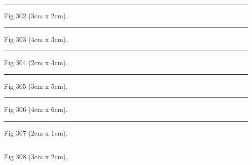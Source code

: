 \documentclass[a4paper,11pt]{article}
\begin{document}
\begin{swarmwrap}%
  \begin{minipage}[t]{3cm}
    \centering
    \rule{\linewidth}{2cm}
    {\footnotesize Fig 302 (3cm x 2cm).}
  \end{minipage}%
\end{swarmwrap}%
\swarmwrapnext
\lipsum[2]%

\begin{swarmwrap}%
  \begin{minipage}[t]{4cm}
    \centering
    \rule{\linewidth}{3cm}
    {\footnotesize Fig 303 (4cm x 3cm).}
  \end{minipage}%
\end{swarmwrap}%
\swarmwrapnext
\lipsum[3]%

\begin{swarmwrap}%
  \begin{minipage}[t]{2cm}
    \centering
    \rule{\linewidth}{4cm}
    {\footnotesize Fig 304 (2cm x 4cm).}
  \end{minipage}%
\end{swarmwrap}%
\swarmwrapnext
\lipsum[4]%

\begin{swarmwrap}%
  \begin{minipage}[t]{3cm}
    \centering
    \rule{\linewidth}{5cm}
    {\footnotesize Fig 305 (3cm x 5cm).}
  \end{minipage}%
\end{swarmwrap}%
\swarmwrapnext
\lipsum[5]%

\begin{swarmwrap}%
  \begin{minipage}[t]{4cm}
    \centering
    \rule{\linewidth}{6cm}
    {\footnotesize Fig 306 (4cm x 6cm).}
  \end{minipage}%
\end{swarmwrap}%
\swarmwrapnext
\lipsum[6]%

\begin{swarmwrap}%
  \begin{minipage}[t]{2cm}
    \centering
    \rule{\linewidth}{1cm}
    {\footnotesize Fig 307 (2cm x 1cm).}
  \end{minipage}%
\end{swarmwrap}%
\swarmwrapnext
\lipsum[7]%

\begin{swarmwrap}%
  \begin{minipage}[t]{3cm}
    \centering
    \rule{\linewidth}{2cm}
    {\footnotesize Fig 308 (3cm x 2cm).}
  \end{minipage}%
\end{swarmwrap}%
\swarmwrapnext
\lipsum[8]%
\end{document}
